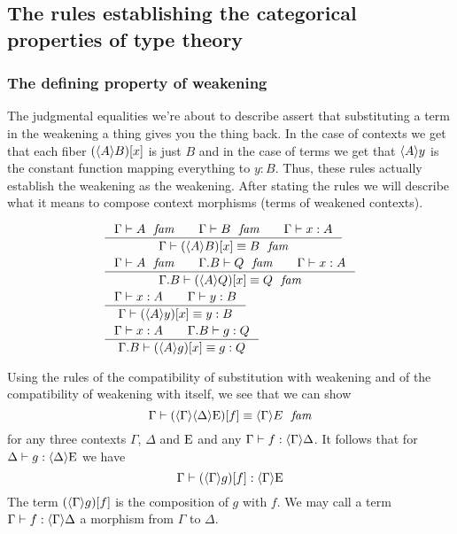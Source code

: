 \subsection{The rules establishing the categorical properties of type theory}
\subsubsection{The defining property of weakening}
The judgmental equalities we're about to describe assert that substituting a term
in the weakening a thing gives you the thing back. In the case of contexts we get that each fiber
$\subst{x}{\ctxwk{A}{B}}$ is just $B$ and in the case of terms we get 
that $\ctxwk{A}{y}$ is the constant function
mapping everything to $y:B$. Thus, these rules actually establish the weakening
as the weakening. After stating the rules we will describe what it means to
compose context morphisms (terms of weakened contexts).

\begin{align}
& \inference{\jfam{\Gamma}{A}\qquad\jfam{\Gamma}{B}\qquad\jterm{\Gamma}{A}{x}}{\jfameq{\Gamma}{\subst{x}{\ctxwk{A}{B}}}{B}}\\
& \inference{\jfam{\Gamma}{A}\qquad\jfam{\ctxext{\Gamma}{B}}{Q}\qquad\jterm{\Gamma}{A}{x}}{\jfameq{\ctxext{\Gamma}{B}}{\subst{x}{\ctxwk{A}{Q}}}{Q}}\\
& \inference{\jterm{\Gamma}{A}{x}\qquad\jterm{\Gamma}{B}{y}}{\jtermeq{\Gamma}{B}{\subst{x}{\ctxwk{A}{y}}}{y}}\\
& \inference{\jterm{\Gamma}{A}{x}\qquad\jterm{\ctxext{\Gamma}{B}}{Q}{g}}{\jtermeq{\ctxext{\Gamma}{B}}{Q}{\subst{x}{\ctxwk{A}{g}}}{g}}
\end{align}

Using the rules of the compatibility of substitution with weakening and of the
compatibility of weakening with itself, we see that we can show
\begin{equation*}
\jfameq{\Gamma}{\subst{f}{\ctxwk{\Gamma}{{\Delta}{\greek{E}}}}}{\ctxwk{\Gamma}{E}}
\end{equation*}
for any three contexts $\Gamma$, $\Delta$ and $\mathrm{E}$ and any $\jhom{\Gamma}{\Delta}{f}$.
It follows that for $\jhom{\Delta}{\greek{E}}{g}$ we have
\begin{equation*}
\jhom{\Gamma}{\greek{E}}{\subst{f}{\ctxwk{\Gamma}{g}}}
\end{equation*}
The term $\jcomp{\Gamma}{f}{g}$ is the composition of $g$ with $f$. We may call
a term $\jhom{\Gamma}{\Delta}{f}$ a morphism from $\Gamma$ to $\Delta$.

